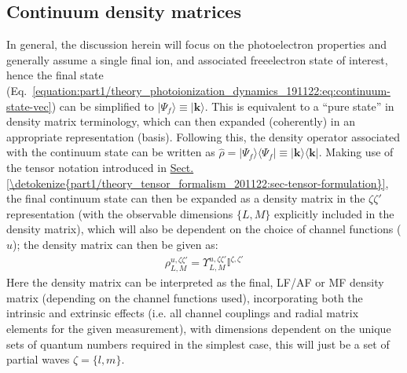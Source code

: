 \documentclass[letterpaper,table,10pt,english]{jupyterBook}
\begin{document}
\subsection{Continuum density matrices}
\label{\detokenize{part1/theory_density_matrices_310123:continuum-density-matrices}}\label{\detokenize{part1/theory_density_matrices_310123:id4}}
\sphinxAtStartPar
In general, the discussion herein will focus on the photoelectron properties and generally assume a single final ion, and associated free\sphinxhyphen{}electron state of interest, hence the final state (Eq. \eqref{equation:part1/theory_photoionization_dynamics_191122:eq:continuum-state-vec}) can be simplified to \(|\Psi_f\rangle\equiv|\mathbf{k}\rangle\). This is equivalent to a “pure state” in density matrix terminology, which can then expanded (coherently) in an appropriate representation (basis). Following this, the density operator associated with the continuum state can be written as \(\hat{\rho}=|\Psi_f\rangle\langle\Psi_f|\equiv|\mathbf{k}\rangle\langle\mathbf{k}|\). Making use of the tensor notation introduced in \hyperref[\detokenize{part1/theory_tensor_formalism_201122:sec-tensor-formulation}]{Sect.\@ \ref{\detokenize{part1/theory_tensor_formalism_201122:sec-tensor-formulation}}}, the final continuum state can then be expanded as a density matrix in the \(\zeta\zeta'\) representation (with the observable dimensions \(\{L,M\}\) explicitly included in the density matrix), which will also be dependent on the choice of channel functions (\(u\)); the density matrix can then be given as:
\begin{equation}\label{equation:part1/theory_density_matrices_310123:eqn:full-density-mat}
\begin{split}
{\rho}_{L,M}^{u,\zeta\zeta'}=\varUpsilon_{L,M}^{u,\zeta\zeta'}\mathbb{I}^{\zeta,\zeta'}
\end{split}
\end{equation}
\sphinxAtStartPar
Here the density matrix can be interpreted as the final, LF/AF or MF density matrix (depending on the channel functions used), incorporating both the intrinsic and extrinsic effects (i.e. all channel couplings and radial matrix elements for the given measurement), with dimensions dependent on the unique sets of quantum numbers required \sphinxhyphen{} in the simplest case, this will just be a set of partial waves \(\zeta = \{l,m\}\).
\end{document}
